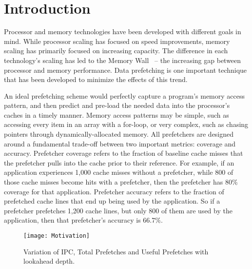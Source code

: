 \section{Introduction}
\label{Introduction}

Processor and memory technologies have been developed with different
goals in mind. While processor scaling has focused on speed
improvements, memory scaling has primarily focused on increasing
capacity. The difference in each technology's scaling has led to the
Memory Wall~\cite{MemWall} -- the increasing gap between processor and
memory performance. Data prefetching is one important technique that
has been developed to minimize the effects of this trend.


An ideal prefetching scheme would perfectly capture a program's memory
access pattern, and then predict and pre-load the needed data into the
processor's caches in a timely manner.  Memory access patterns may be
simple, such as accessing every item in an array with a for-loop, or
very complex, such as chasing pointers through dynamically-allocated
memory.  %
All prefetchers are designed around a fundamental trade-off between
two important metrics: coverage and accuracy. Prefetcher coverage
refers to the fraction of baseline cache misses that the prefetcher
pulls into the cache prior to their reference.  For example, if an
application experiences 1,000 cache misses without a prefetcher, while
800 of those cache misses become hits with a prefetcher, then the
prefetcher has 80\% coverage for that application.  Prefetcher
accuracy refers to the fraction of prefetched cache lines that end up
being used by the application. So if a prefetcher prefetches 1,200
cache lines, but only 800 of them are used by the application, then
that prefetcher's accuracy is 66.7\%.


\begin{figure}[t]
\texttt{[image: Motivation]}
\caption{Variation of IPC, Total Prefetches and Useful Prefetches with
  lookahead depth.}
\label{Fig:Motivation}
\end{figure}

